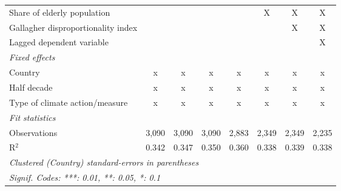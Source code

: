 \begin{tabular}{lccccccc}
   Share of elderly population                                                            &         &         &         &         & X             & X             & X\\  
   Gallagher disproportionality index                                                     &         &         &         &         &               & X             & X\\  
   Lagged dependent variable                                                              &         &         &         &         &               &               & X\\  
   \emph{Fixed effects}\\
   Country                                                                                & x       & x       & x       & x       & x             & x             & x\\  
   Half decade                                                                            & x       & x       & x       & x       & x             & x             & x\\  
   Type of climate action/measure                                                         & x       & x       & x       & x       & x             & x             & x\\  
   \midrule \emph{Fit statistics}\\
   Observations                                                                           & 3,090   & 3,090   & 3,090   & 2,883   & 2,349         & 2,349         & 2,235\\  
   R$^2$                                                                                  & 0.342   & 0.347   & 0.350   & 0.360   & 0.338         & 0.339         & 0.338\\  
   \midrule
   \multicolumn{8}{l}{\emph{Clustered (Country) standard-errors in parentheses}}\\
   \multicolumn{8}{l}{\emph{Signif. Codes: ***: 0.01, **: 0.05, *: 0.1}}\\
\end{tabular}
\par\endgroup


